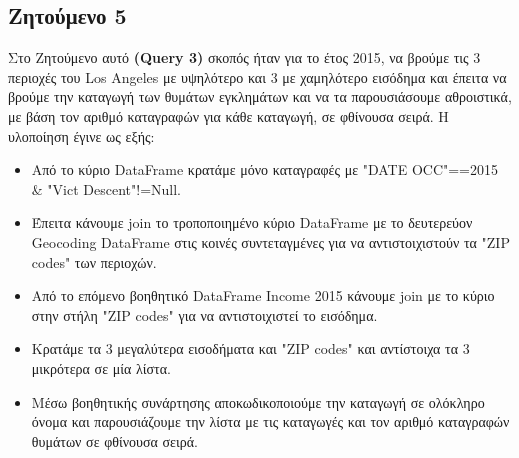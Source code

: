 \documentclass{article}
\begin{document}


\subsection*{Ζητούμενο 5}
\label{subsec:Z5}

Στο Ζητούμενο αυτό \textbf{(Query 3)}  σκοπός ήταν για το έτος 2015, να βρούμε τις 3 περιοχές του  Los Angeles  με υψηλότερο και 3 με χαμηλότερο εισόδημα και έπειτα να βρούμε την καταγωγή των θυμάτων εγκλημάτων και να τα παρουσιάσουμε αθροιστικά, με βάση τον αριθμό καταγραφών για κάθε καταγωγή, σε φθίνουσα σειρά. Η υλοποίηση έγινε ως εξής: 
\begin{itemize}
    \item   Από το κύριο  DataFrame  κρατάμε μόνο καταγραφές με  "DATE OCC"==2015 \& "Vict Descent"!=Null.
    \item   Έπειτα κάνουμε  join  το τροποποιημένο κύριο  DataFrame  με το δευτερεύον  Geocoding DataFrame στις κοινές συντεταγμένες για να αντιστοιχιστούν τα  "ZIP codes"  των περιοχών. 
    \item   Από το επόμενο βοηθητικό  DataFrame Income 2015  κάνουμε join  με το κύριο στην στήλη  "ZIP codes"  για να αντιστοιχιστεί το εισόδημα. 
    \item   Κρατάμε τα 3 μεγαλύτερα εισοδήματα και  "ZIP codes"  και αντίστοιχα τα 3 μικρότερα σε μία λίστα. 
    \item   Μέσω βοηθητικής συνάρτησης αποκωδικοποιούμε την καταγωγή σε ολόκληρο όνομα και παρουσιάζουμε την λίστα με τις καταγωγές και τον αριθμό καταγραφών θυμάτων σε φθίνουσα σειρά. 
\end{itemize}
\end{document}

